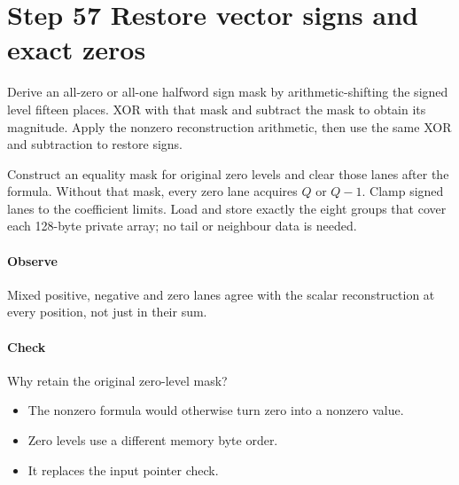 \section{Step 57 Restore vector signs and exact zeros}\label{h263-quant-s07}
Derive an all-zero or all-one halfword sign mask by arithmetic-shifting the signed
level fifteen places. XOR with that mask and subtract the mask to obtain its
magnitude. Apply the nonzero reconstruction arithmetic, then use the same XOR
and subtraction to restore signs.

Construct an equality mask for original zero levels and clear those lanes after
the formula. Without that mask, every zero lane acquires $Q$ or $Q-1$. Clamp
signed lanes to the coefficient limits. Load and store exactly the eight groups
that cover each 128-byte private array; no tail or neighbour data is needed.

\paragraph{Observe} Mixed positive, negative and zero lanes agree with the
scalar reconstruction at every position, not just in their sum.
\paragraph{Check} Why retain the original zero-level mask?
\begin{itemize}
  \item[A.] The nonzero formula would otherwise turn zero into a nonzero value.
  \item[B.] Zero levels use a different memory byte order.
  \item[C.] It replaces the input pointer check.
\end{itemize}
